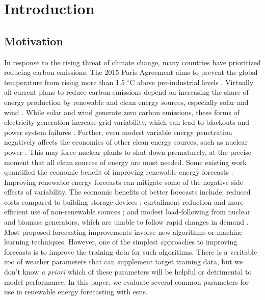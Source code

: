 \section{Introduction}
\subsection{Motivation}
In response to the rising threat of climate change, many countries have
prioritized reducing carbon emissions. The 2015 Paris
Agreement aims to prevent the global temperature from rising more than 1.5
$^\circ$C above pre-industrial levels \cite{noauthor_paris_nodate}. Virtually
all current plans to reduce carbon emissions depend on increasing the share of
energy production by renewable and clean energy sources, especially solar and
wind \cite{cany_nuclear_2018, chilvers_realising_2017,99th_general_assembly_illinois_2016,isee_illinois_2015}.
 While solar and wind generate zero carbon emissions, these
forms of electricity generation increase grid variability, which can lead to
blackouts and power system failures
\cite{haes_alhelou_survey_2019}. Further, even modest variable energy
penetration negatively affects the economics of other clean energy sources,
such as nuclear power
\cite{cany_nuclear_2018,keppler_carbon_2011,illinois_commerce_commision_icc_potential_2015}. This may force nuclear plants to shut down prematurely, at the
precise moment that all clean sources of energy are most needed. Some existing
work quantified the economic benefit of improving
renewable energy forecasts \cite{wang_quantifying_2016, mc_garrigle_quantifying_2015, brancucci_martinez-anido_value_2016}.
Improving renewable energy forecasts can
mitigate some of the negative side effects of variability. The economic
benefits of better  forecasts include: reduced costs compared to building
storage devices \cite{wang_quantifying_2016}; curtailment reduction and more
efficient use of non-renewable sources \cite{mc_garrigle_quantifying_2015}; and
modest load-following from nuclear and biomass
generators, which are unable to follow rapid changes in demand
\cite{brancucci_martinez-anido_value_2016}. Most proposed forecasting
improvements involve new algorithms or machine learning techniques. However,
one of the simplest approaches to improving forecasts is to improve the
training data for such algorithms. There is a veritable zoo of weather
parameters that can supplement target training data, but we don't know \textit{a
priori} which of these parameters will be helpful or detrimental to model
performance. In this paper, we evaluate several common parameters for use
in renewable energy forecasting with \glspl{esn}.

